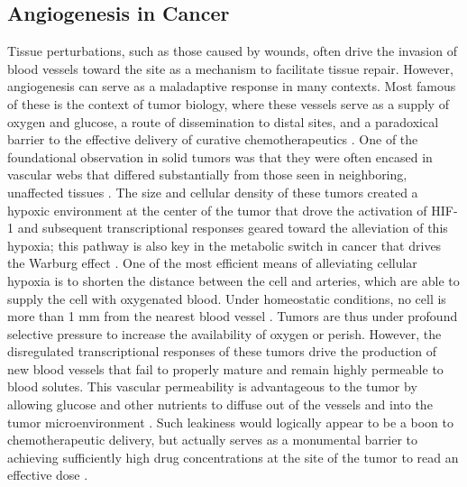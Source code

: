 \subsection{Angiogenesis in Cancer}\label{cancerang}

Tissue perturbations, such as those caused by wounds, often drive the invasion of blood vessels toward the site as a mechanism to facilitate tissue repair. However, angiogenesis can serve as a maladaptive response in many contexts. Most famous of these is the context of tumor biology, where these vessels serve as a supply of oxygen and glucose, a route of dissemination to distal sites, and a paradoxical barrier to the effective delivery of curative chemotherapeutics \citep{Park2016, Yonuku2017}. One of the foundational observation in solid tumors was that they were often encased in vascular webs that differed substantially from those seen in neighboring, unaffected tissues \citep{Chung2011}. The size and cellular density of these tumors created a hypoxic environment at the center of the tumor that drove the activation of HIF-1\textalpha{} and subsequent transcriptional responses geared toward the alleviation of this hypoxia; this pathway is also key in the metabolic switch in cancer that drives the Warburg effect \citep{Mesange2014, Masoud2015, Courtnay2015}. One of the most efficient means of alleviating cellular hypoxia is to shorten the distance between the cell and arteries, which are able to supply the cell with oxygenated blood. Under homeostatic conditions, no cell is more than 1 mm from the nearest blood vessel \citep{Weber2020}. Tumors are thus under profound selective pressure to increase the availability of oxygen or perish. However, the disregulated transcriptional responses of these tumors drive the production of new blood vessels that fail to properly mature and remain highly permeable to blood solutes. This vascular permeability is advantageous to the tumor by allowing glucose and other nutrients to diffuse out of the vessels and into the tumor microenvironment \citep{Park2016}. Such leakiness would logically appear to be a boon to chemotherapeutic delivery, but actually serves as a monumental barrier to achieving sufficiently high drug concentrations at the site of the tumor to read an effective dose \citep{Datta2015, Goel2012}. 

